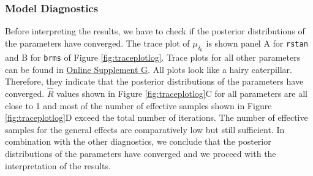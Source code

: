 \documentclass[
  english,
  doc,floatsintext]{apa6}
\begin{document}
\hypertarget{model-diagnostics-1}{%
\subsubsection{Model Diagnostics}\label{model-diagnostics-1}}

Before interpreting the results, we have to check if the posterior distributions of the parameters have converged. The trace plot of \(\mu_{\delta_{6}}\) is shown panel A for \texttt{rstan} and B for \texttt{brms} of Figure \ref{fig:traceplotlog}. Trace plots for all other parameters can be found in \href{https://github.com/MyrtheV/Bayesian-Hierarchical-Modelling-An-Introduction-and-Reassessment/tree/main/G\%20-\%20Trace\%20Plots\%20}{Online Supplement G}. All plots look like a hairy caterpillar. Therefore, they indicate that the posterior distributions of the parameters have converged. \(\hat{R}\) values shown in Figure \ref{fig:traceplotlog}C for all parameters are all close to 1 and most of the number of effective samples shown in Figure \ref{fig:traceplotlog}D exceed the total number of iterations. The number of effective samples for the general effects are comparatively low but still sufficient. In combination with the other diagnostics, we conclude that the posterior distributions of the parameters have converged and we proceed with the interpretation of the results.
\end{document}
